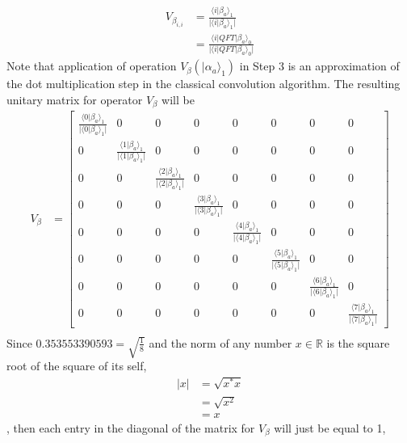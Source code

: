 \begin{example}
\begin{align*}
		V_{\beta_{i,i}} &= \frac{\langle i \vert \beta_{a} \rangle_1}{\vert \langle i \vert \beta_{a} \rangle_1 \vert} \\
		&= \frac{\langle i \vert QFT \vert \beta_{a} \rangle_0}{\vert \langle i \vert QFT \vert \beta_{a} \rangle_0 \vert}
	\end{align*}
	Note that application of operation $V_\beta \left( \vert \alpha_{a} \rangle_1 \right)$ in Step 3 is an approximation of the dot multiplication step in the classical convolution algorithm. The resulting unitary matrix for operator $V_\beta$ will be
	\begin{align*}	
		V_\beta &=
		\begin{bmatrix}
			\frac{\langle 0 \vert \beta_{a} \rangle_1}{\vert \langle 0 \vert \beta_{a} \rangle_1 \vert} & 0 & 0 & 0 & 0 & 0 & 0 & 0 \\
			0 & \frac{\langle 1 \vert \beta_{a} \rangle_1}{\vert \langle 1 \vert \beta_{a} \rangle_1 \vert} & 0 & 0 & 0 & 0 & 0 & 0 \\
			0 & 0 & \frac{\langle 2 \vert \beta_{a} \rangle_1}{\vert \langle 2 \vert \beta_{a} \rangle_1 \vert} & 0 & 0 & 0 & 0 & 0 \\
			0 & 0 & 0 & \frac{\langle 3 \vert \beta_{a} \rangle_1}{\vert \langle 3 \vert \beta_{a} \rangle_1 \vert} & 0 & 0 & 0 & 0 \\
			0 & 0 & 0 & 0 & \frac{\langle 4 \vert \beta_{a} \rangle_1}{\vert \langle 4 \vert \beta_{a} \rangle_1 \vert} & 0 & 0 & 0 \\
			0 & 0 & 0 & 0 & 0 & \frac{\langle 5 \vert \beta_{a} \rangle_1}{\vert \langle 5 \vert \beta_{a} \rangle_1 \vert} & 0 & 0 \\
			0 & 0 & 0 & 0 & 0 & 0 & \frac{\langle 6 \vert \beta_{a} \rangle_1}{\vert \langle 6 \vert \beta_{a} \rangle_1 \vert} & 0 \\
			0 & 0 & 0 & 0 & 0 & 0 & 0 & \frac{\langle 7 \vert \beta_{a} \rangle_1}{\vert \langle 7 \vert \beta_{a} \rangle_1 \vert}
		\end{bmatrix}\\
	\end{align*}
Since $ 0.353553390593 = \sqrt{\frac{1}{8}}$ and the norm of any number $x \in \mathbb{R}$ is the square root of the square of its self, 
	\begin{align*}
		\vert x \vert &= \sqrt{x^* x} \\
		&= \sqrt{x^2} \\
		&= x
	\end{align*},
then each entry in the diagonal of the matrix for $V_\beta$ will just be equal to 1,

\end{example}
